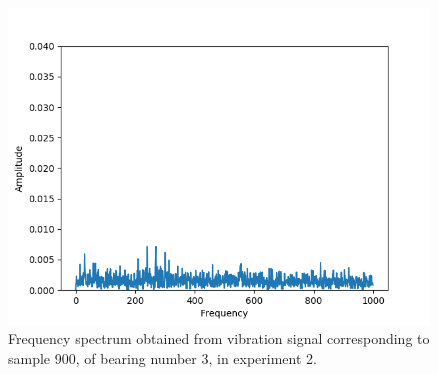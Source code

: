 \documentclass[../Main/thesis.tex]{subfiles}
\begin{document}
\begin{figure}[H] 
   \centering
   \includegraphics[width=4.4in]{../fig/experiment2_bearing3_fft.png} 
   \caption{Frequency spectrum obtained from vibration signal corresponding to sample 900, of bearing number 3, in experiment 2.}
   \label{fig:bearing3-experiment2-fft}
\end{figure}
\end{document}
